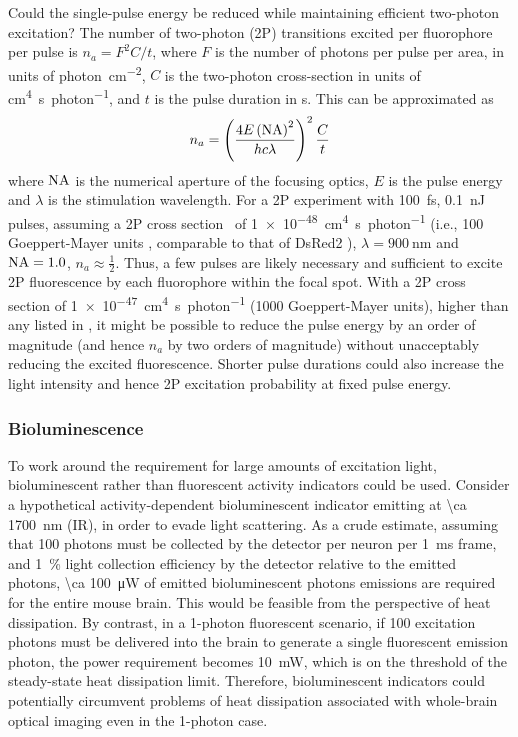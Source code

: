Could the single-pulse energy be reduced while maintaining efficient two-photon excitation? The number of two-photon (2P) transitions excited per fluorophore per pulse is $n_a = F^2 C / t$, where $F$ is the number of photons per pulse per area, in units of \si{photon\per\centi\meter\squared}, $C$ is the two-photon cross-section in units of \si{\centi\meter\tothe{4}\second\per photon}, and $t$ is the pulse duration in \si{\second}.
This can be approximated as
\[n_a = \left(\frac{4E\left(\text{NA}\right)^2}{h c \lambda}\right)^2 \frac{C}{t}\]
where $\text{NA}$ is the numerical aperture of the focusing optics, $E$ is the pulse energy and $\lambda$ is the stimulation wavelength.
For a 2P experiment with \SI{100}{\femto\second}, \SI{0.1}{\nano\joule} pulses, assuming a 2P cross section~\cite{masters06, drobizhev2011} of \SI{1e-48}{\centi\meter\tothe{4}\second\per photon} (i.e., 100 Goeppert-Mayer units \cite{Goeppert-Mayer1931}, comparable to that of DsRed2 \cite{drobizhev2011}), $\lambda=\SI{900}{\nano\meter}$ and $\text{NA}=1.0$, $n_a \approx \frac{1}{2}$.
Thus, a few pulses are likely necessary and sufficient to excite 2P fluorescence by each fluorophore within the focal spot. With a 2P cross section of \SI{1e-47}{\centi\meter\tothe{4}\second\per photon} (1000 Goeppert-Mayer units), higher than any listed in \cite{drobizhev2011}, it might be possible to reduce the pulse energy by an order of magnitude (and hence $n_a$ by two orders of magnitude) without unacceptably reducing the excited fluorescence. Shorter pulse durations could also increase the light intensity and hence 2P excitation probability at fixed pulse energy.

\subsubsection{Bioluminescence}
To work around the requirement for large amounts of excitation light, bioluminescent rather than fluorescent activity indicators could be used.
Consider a hypothetical activity-dependent bioluminescent indicator emitting at \SI{\ca 1700}{\nano\meter} (IR), in order to evade light scattering.
As a crude estimate, assuming that 100 photons must be collected by the detector per neuron per \SI{1}{\milli\second} frame, and \SI{1}{\percent} light collection efficiency by the detector relative to the emitted photons, \SI{\ca 100}{\micro\watt} of emitted bioluminescent photons emissions are required for the entire mouse brain.
This would be feasible from the perspective of heat dissipation.
By contrast, in a 1-photon fluorescent scenario, if 100 excitation photons must be delivered into the brain to generate a single fluorescent emission photon, the power requirement becomes \SI{10}{\milli\watt}, which is on the threshold of the steady-state heat dissipation limit.
Therefore, bioluminescent indicators could potentially circumvent problems of heat dissipation associated with whole-brain optical imaging even in the 1-photon case.

